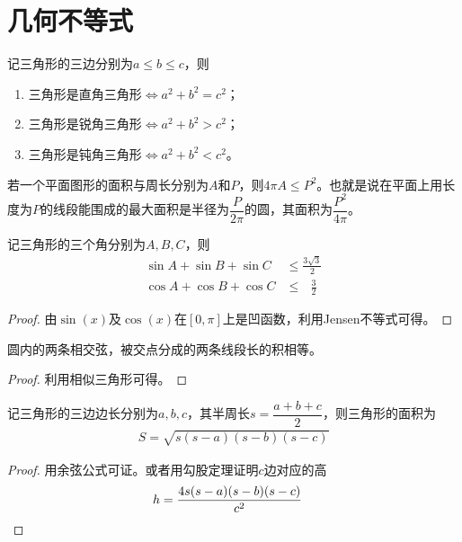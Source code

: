 
\section{几何不等式}
\label{sec:geometric-inequality}

\begin{theorem}[Pythagorean不等式]
  记三角形的三边分别为$a\le b\le c$，则
  \begin{enumerate}
  \item 三角形是直角三角形$\iff a^2+b^2=c^2$；
  \item 三角形是锐角三角形$\iff a^2+b^2>c^2$；
  \item 三角形是钝角三角形$\iff a^2+b^2<c^2$。
  \end{enumerate}
\end{theorem}

\begin{theorem}
  若一个平面图形的面积与周长分别为$A$和$P$，则$4\pi A\le P^2$。也就是说在平面上用长度为$P$的线段能围成的最大面积是半径为$\dfrac{P}{2\pi}$的圆，其面积为$\dfrac{P^2}{4\pi}$。
\end{theorem}

\begin{theorem}
  记三角形的三个角分别为$A,B,C$，则
  \begin{align*}
    \sin A +\sin B + \sin C&\le\frac{3\sqrt3}{2}\\
    \cos A +\cos B + \cos C&\le\phantom{3}\,\frac{3}{2}
  \end{align*}
\end{theorem}
\begin{proof}
  由$\sin(x)$及$\cos(x)$在$[0,\pi]$上是凹函数，利用Jensen不等式可得。
\end{proof}

\begin{theorem}
  圆内的两条相交弦，被交点分成的两条线段长的积相等。
\end{theorem}
\begin{proof}
  利用相似三角形可得。
\end{proof}

\begin{theorem}
  记三角形的三边边长分别为$a,b,c$，其半周长$s=\dfrac{a+b+c}2$，则三角形的面积为
  \begin{align}
    S=\sqrt{s(s-a)(s-b)(s-c)}
  \end{align}
\end{theorem}
\begin{proof}
  用余弦公式可证。或者用勾股定理证明$c$边对应的高
  \begin{align*}
    h=\frac{4s(s-a)(s-b)(s-c)}{c^2} &\qedhere
  \end{align*}
\end{proof}

